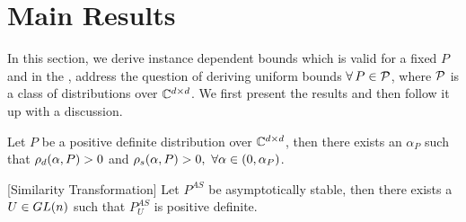 \section{Main Results}\label{sec:mainresults}
In this section, we derive instance dependent bounds  which is valid for a fixed $P$ and in the , address the question of deriving uniform bounds $\forall\,P\in \P$, where $\P$ is a class of distributions over $\C^{\dcd}$. We first present the results and then follow it up with a discussion.
\begin{lemma}\label{lm:pd}
Let $P$ be a positive definite distribution over $\C^{\dcd}$, then there exists an $\alpha_P$ such that $\rhod{P}>0$ and $\rhos{P}>0,~\forall \alpha \in (0,\alpha_P)$.
\end{lemma}
\begin{comment}
\begin{proof}
\begin{align*}
\rhos{P}&=\inf_{x:\norm{x}=1}x^* (A_P+A_P^*)x -\alpha x^*\EE{A_t^* A_t} x\\
&=\inf_{x:\norm{x}=1}x^* (A_P+A_P^*)x -\alpha x^* A^*_P A_P -\alpha x^* \EE{M_t^* M_t} x\\
&\geq \lambda_{\min}(A^*_P+A_P)-\alpha \norm{A_P}^2-\sigma^2_P
\end{align*}
The proof is complete by choosing $\alpha_P<\frac{\lambda_{\min}(A^*_P+A_P)}{\norm{A_P}^2+\sigma^2_P}$
\end{proof}
\end{comment}
\begin{lemma}\label{lm:simtran}[Similarity Transformation]
Let $P^{AS}$ be asymptotically stable, then there exists a $U\in \gln$ such that $P^{AS}_U$ is positive definite.
\end{lemma}

